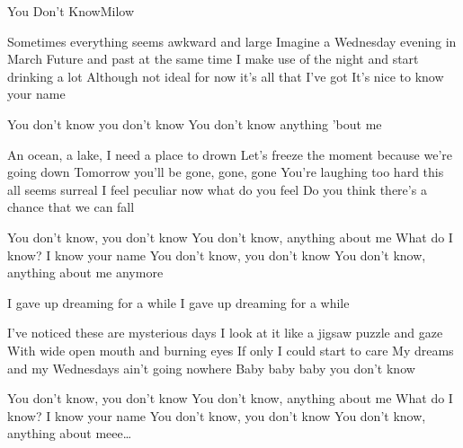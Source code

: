 \documentclass[a4paper,11pt,french]{article}
\begin{document}

\begin{Song}{You Don't Know}{Milow}

\begin{multicols}{2}
\begin{Verse}
Sometimes everything seems awkward and large
Imagine a Wednesday evening in March
Future and past at the same time
I make use of the night and start drinking a lot
Although not ideal for now it's all that I've got
It's nice to know your name
\end{Verse}
\espaceInterStrophe

\begin{Chorus}
You don't know you don't know
You don't know anything 'bout me
\end{Chorus}
\espaceInterStrophe

\begin{Verse}
An ocean, a lake, I need a place to drown
Let's freeze the moment because we're going down
Tomorrow you'll be gone, gone, gone
You're laughing too hard this all seems surreal
I feel peculiar now what do you feel
Do you think there's a chance that we can fall
\end{Verse}
\espaceInterStrophe

\begin{Chorus}
You don't know, you don't know
You don't know, anything about me
What do I know? I know your name
You don't know, you don't know
You don't know, anything about me anymore
\end{Chorus}
\columnbreak

\begin{Bridge}
I gave up dreaming for a while
I gave up dreaming for a while
\end{Bridge}
\espaceInterStrophe

\begin{Verse}
I've noticed these are mysterious days
I look at it like a jigsaw puzzle and gaze
With wide open mouth and burning eyes
If only I could start to care
My dreams and my Wednesdays ain't going nowhere
Baby baby baby you don't know
\end{Verse}
\espaceInterStrophe

\begin{Chorus}
You don't know, you don't know
You don't know, anything about me
What do I know? I know your name
You don't know, you don't know
You don't know, anything about meee\dots
\espaceInterStrophe


\end{Chorus}
\end{multicols}
\end{Song}
\end{document}
